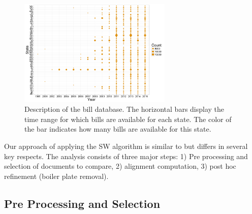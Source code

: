 \documentclass[12pt]{article} %
\begin{document}
\begin{figure}[ht!]
    \centering
    \includegraphics[width=0.65\textwidth]{figures/year_count_by_state.png}
    \caption{Description of the bill database. The horizontal bars display the time range for which bills are available for each state. The color of the bar indicates how many bills are available for this state.}
    \label{fig:bill_desc}
\end{figure}

Our approach of applying the SW algorithm is similar to \citet{wilkerson2015tracing} but differs in several key respects. The analysis consists of three major steps: 1) Pre processing and selection of documents to compare, 2) alignment computation, 3) post hoc refinement (boiler plate removal). 

\subsection{Pre Processing and Selection}
\end{document}
